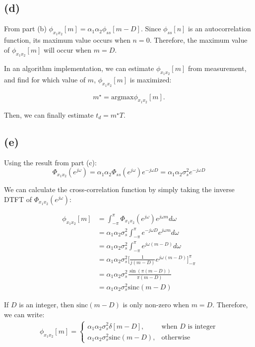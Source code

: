 \documentclass{article}
\begin{document}
\subsection{(d)}

From part (b) $\phi_{x_1x_2}[m] = \alpha_1\alpha_2\phi_{ss}[m-D]$. Since $\phi_{ss}[n]$ is an autocorrelation function, its maximum value occurs when $n = 0$. Therefore, the maximum value of $\phi_{x_1x_2}[m]$ will occur when $m = D$.

In an algorithm implementation, we can estimate $\phi_{x_1x_2}[m]$ from measurement, and find for which value of $m$, $\phi_{x_1x_2}[m]$ is maximized:

\begin{equation}
m^\star = \mathrm{argmax}\phi_{x_1x_2}[m].
\end{equation}

Then, we can finally estimate $t_d = m^\star T$.

\subsection{(e)}

Using the result from part (c): 
\begin{equation}
\Phi_{x_1x_2}(e^{j\omega}) = \alpha_1\alpha_2\Phi_{ss}(e^{j\omega})e^{-j\omega D} = \alpha_1\alpha_2\sigma_s^2e^{-j\omega D}
\end{equation}

We can calculate the cross-correlation function by simply taking the inverse DTFT of $\Phi_{x_1x_2}(e^{j\omega})$:

\begin{align} \nonumber
\phi_{x_1x_2}[m] &= \int_{-\pi}^{\pi}\Phi_{x_1x_2}(e^{j\omega})e^{j\omega m}d\omega \\
&=\alpha_1\alpha_2\sigma_s^2\int_{-\pi}^{\pi}e^{-j\omega D}e^{j\omega m} d\omega \\ 
&=\alpha_1\alpha_2\sigma_s^2\int_{-\pi}^{\pi}e^{j\omega(m-D)} d\omega \\ 
&=\alpha_1\alpha_2\sigma_s^2\bigg[\frac{1}{j(m-D)}e^{j\omega(m-D)}\bigg]_{-\pi}^{\pi} \\
&=\alpha_1\alpha_2\sigma_s^2\frac{\sin(\pi(m-D))}{\pi(m-D)} \\  
&=\alpha_1\alpha_2\sigma_s^2\mathrm{sinc}(m-D)
\end{align}

If $D$ is an integer, then $\mathrm{sinc}(m-D)$ is only non-zero when $m = D$. Therefore, we can write:
\begin{align} \nonumber
\phi_{x_1x_2}[m] = \begin{cases}
\alpha_1\alpha_2\sigma_s^2\delta[m-D], & \text{when $D$ is integer} \\
\alpha_1\alpha_2\sigma_s^2\mathrm{sinc}(m-D), & \text{otherwise}
\end{cases}
\end{align}
\end{document}
